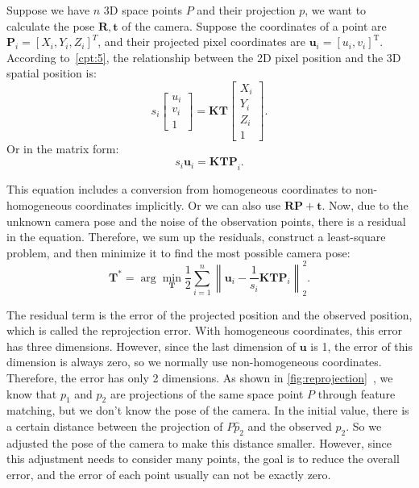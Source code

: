Suppose we have $n$ 3D space points $P$ and their projection $p$, we want to calculate the pose $\mathbf{R}, \mathbf{t}$ of the camera. Suppose the coordinates of a point are $\mathbf{P}_i=[X_i,Y_i,Z_i]^T$, and their projected pixel coordinates are $\mathbf{u}_i=[u_i,v_i]^ \mathrm{T}$. According to~\ref{cpt:5}, the relationship between the 2D pixel position and the 3D spatial position is:
\begin{equation}
s_i \left[ 
\begin{array}{l}
u_i \\ v_i \\ 1
\end{array}
\right] = \mathbf{K} \mathbf{T} \left[ 
\begin{array}{l}
X_i \\ Y_i \\ Z_i \\ 1
\end{array} \right]  .
\end{equation}
Or in the matrix form:
\[
{{s_i {\mathbf{u}}_i} = \mathbf{K} \mathbf{T} \mathbf{P}}_i.
\]

This equation includes a conversion from homogeneous coordinates to non-homogeneous coordinates implicitly. Or we can also use $\mathbf{R}\mathbf{P}+\mathbf{t}$. Now, due to the unknown camera pose and the noise of the observation points, there is a residual in the equation. Therefore, we sum up the residuals, construct a least-square problem, and then minimize it to find the most possible camera pose:
\begin{equation}
{\mathbf{T}^*} = \arg \mathop {\min }\limits_{\mathbf{T}}  \frac{1}{2}\sum\limits_{i = 1}^n {\left\| {{{\mathbf{u}}_i} - \frac{1}{s_i} \mathbf{K}\mathbf{T}{\mathbf{P}}_i} \right\|_2^2} .
\end{equation}

The residual term is the error of the projected position and the observed position, which is called the reprojection error. With homogeneous coordinates, this error has three dimensions. However, since the last dimension of ${\mathbf{u}}$ is 1, the error of this dimension is always zero, so we normally use non-homogeneous coordinates. Therefore, the error has only 2 dimensions. As shown in \autoref{fig:reprojection}~, we know that $p_1$ and $p_2$ are projections of the same space point $P$ through feature matching, but we don't know the pose of the camera. In the initial value, there is a certain distance between the projection of $P \hat{p}_2$ and the observed $p_2$. So we adjusted the pose of the camera to make this distance smaller. However, since this adjustment needs to consider many points, the goal is to reduce the overall error, and the error of each point usually can not be exactly zero.

